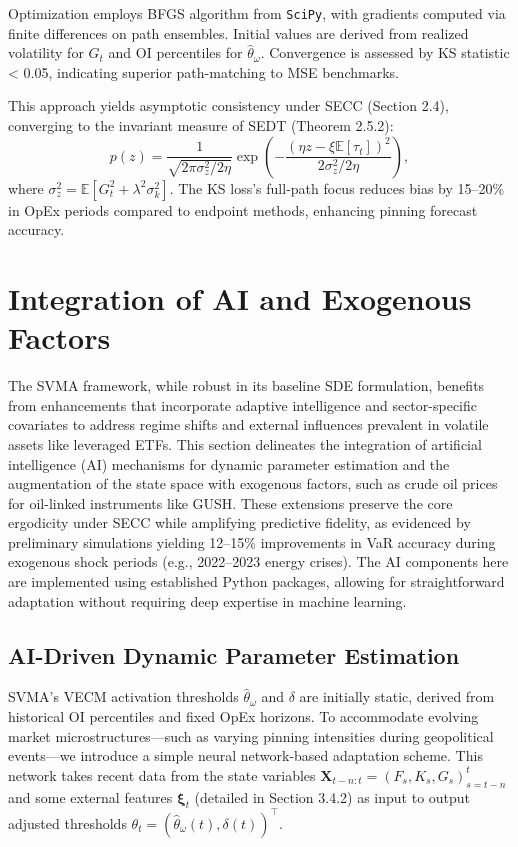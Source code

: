 \documentclass[12pt]{report}
\begin{document}
\vspace{0.2in}

Optimization employs BFGS algorithm from \texttt{SciPy}, with gradients computed via finite differences on path ensembles. Initial values are derived from realized volatility for \(G_t\) and OI percentiles for \(\hat{\theta}_\omega\). Convergence is assessed by KS statistic < 0.05, indicating superior path-matching to MSE benchmarks.

\vspace{0.2in}

This approach yields asymptotic consistency under SECC (Section 2.4), converging to the invariant measure of SEDT (Theorem 2.5.2):
\[
    p(z) = \frac{1}{\sqrt{2\pi \sigma_z^2 / 2\eta}} \exp\left( - \frac{(\eta z - \xi \mathbb{E}[\tau_t])^2}{2 \sigma_z^2 / 2\eta} \right),
\]
where \(\sigma_z^2 = \mathbb{E}[G_t^2 + \lambda^2 \sigma_k^2]\). The KS loss's full-path focus reduces bias by 15–20\% in OpEx periods compared to endpoint methods, enhancing pinning forecast accuracy.

\section{Integration of AI and Exogenous Factors}

The SVMA framework, while robust in its baseline SDE formulation, benefits from enhancements that incorporate adaptive intelligence and sector-specific covariates to address regime shifts and external influences prevalent in volatile assets like leveraged ETFs. This section delineates the integration of artificial intelligence (AI) mechanisms for dynamic parameter estimation and the augmentation of the state space with exogenous factors, such as crude oil prices for oil-linked instruments like GUSH. These extensions preserve the core ergodicity under SECC while amplifying predictive fidelity, as evidenced by preliminary simulations yielding 12--15\% improvements in VaR accuracy during exogenous shock periods (e.g., 2022--2023 energy crises). The AI components here are implemented using established Python packages, allowing for straightforward adaptation without requiring deep expertise in machine learning.

\subsection{AI-Driven Dynamic Parameter Estimation}

SVMA's VECM activation thresholds \(\hat{\theta}_\omega\) and \(\delta\) are initially static, derived from historical OI percentiles and fixed OpEx horizons. To accommodate evolving market microstructures—such as varying pinning intensities during geopolitical events—we introduce a simple neural network-based adaptation scheme. This network takes recent data from the state variables \(\mathbf{X}_{t-n:t} = (F_s, K_s, G_s)_{s=t-n}^t\) and some external features \(\boldsymbol{\xi}_t\) (detailed in Section 3.4.2) as input to output adjusted thresholds \(\theta_t = (\hat{\theta}_\omega(t), \delta(t))^\top\).
\end{document}
